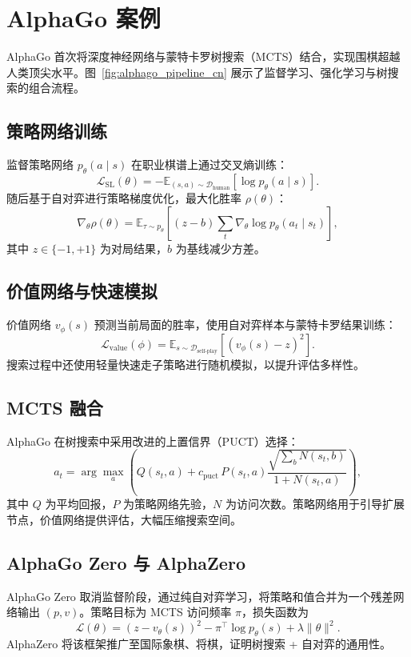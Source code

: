 \documentclass[UTF8,zihao=-4]{ctexart}
\begin{document}
\section{AlphaGo 案例}
AlphaGo 首次将深度神经网络与蒙特卡罗树搜索（MCTS）结合，实现围棋超越人类顶尖水平。图~\ref{fig:alphago_pipeline_cn} 展示了监督学习、强化学习与树搜索的组合流程。

\subsection{策略网络训练}
监督策略网络 $p_{\theta}(a \mid s)$ 在职业棋谱上通过交叉熵训练：
\begin{equation}
  \mathcal{L}_{\text{SL}}(\theta) = -\mathbb{E}_{(s, a) \sim \mathcal{D}_{\text{human}}} [\log p_{\theta}(a \mid s)].
\end{equation}
随后基于自对弈进行策略梯度优化，最大化胜率 $\rho(\theta)$：
\begin{equation}
  \nabla_{\theta} \rho(\theta) = \mathbb{E}_{\tau \sim p_{\theta}} \left[ \left( z - b \right) \sum_{t} \nabla_{\theta} \log p_{\theta}(a_t \mid s_t) \right],
\end{equation}
其中 $z \in \{-1, +1\}$ 为对局结果，$b$ 为基线减少方差。

\subsection{价值网络与快速模拟}
价值网络 $v_{\phi}(s)$ 预测当前局面的胜率，使用自对弈样本与蒙特卡罗结果训练：
\begin{equation}
  \mathcal{L}_{\text{value}}(\phi) = \mathbb{E}_{s \sim \mathcal{D}_{\text{self-play}}} \left[ \left( v_{\phi}(s) - z \right)^2 \right].
\end{equation}
搜索过程中还使用轻量快速走子策略进行随机模拟，以提升评估多样性。

\subsection{MCTS 融合}
AlphaGo 在树搜索中采用改进的上置信界（PUCT）选择：
\begin{equation}
  a_t = \arg\max_{a} \left( Q(s_t, a) + c_{\mathrm{puct}} \, P(s_t, a) \frac{\sqrt{ \sum_b N(s_t, b) }}{1 + N(s_t, a)} \right),
\end{equation}
其中 $Q$ 为平均回报，$P$ 为策略网络先验，$N$ 为访问次数。策略网络用于引导扩展节点，价值网络提供评估，大幅压缩搜索空间。

\subsection{AlphaGo Zero 与 AlphaZero}
AlphaGo Zero 取消监督阶段，通过纯自对弈学习，将策略和值合并为一个残差网络输出 $(p, v)$。策略目标为 MCTS 访问频率 $\pi$，损失函数为
\begin{equation}
  \mathcal{L}(\theta) = (z - v_{\theta}(s))^2 - \pi^{\top} \log p_{\theta}(s) + \lambda \|\theta\|^2.
\end{equation}
AlphaZero 将该框架推广至国际象棋、将棋，证明树搜索 + 自对弈的通用性。
\end{document}
